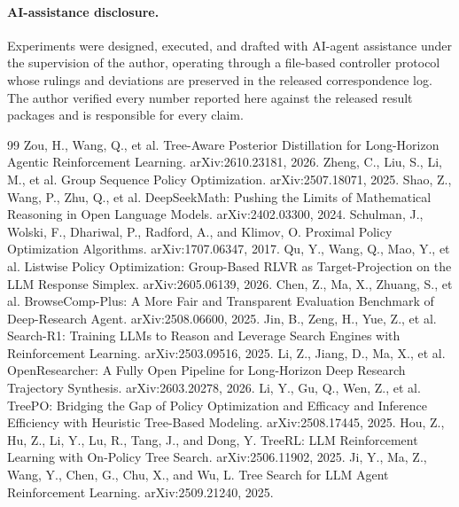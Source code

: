 \documentclass[11pt]{article}
\begin{document}
\paragraph{AI-assistance disclosure.} Experiments were designed, executed,
and drafted with AI-agent assistance under the supervision of the author,
operating through a file-based controller protocol whose rulings and
deviations are preserved in the released correspondence log. The author
verified every number reported here against the released result packages
and is responsible for every claim.

\begin{thebibliography}{99}
 Zou, H., Wang, Q., et al. Tree-Aware Posterior
Distillation for Long-Horizon Agentic Reinforcement Learning.
arXiv:2610.23181, 2026.
 Zheng, C., Liu, S., Li, M., et al. Group Sequence Policy
Optimization. arXiv:2507.18071, 2025.
 Shao, Z., Wang, P., Zhu, Q., et al. DeepSeekMath: Pushing
the Limits of Mathematical Reasoning in Open Language Models.
arXiv:2402.03300, 2024.
 Schulman, J., Wolski, F., Dhariwal, P., Radford, A., and
Klimov, O. Proximal Policy Optimization Algorithms. arXiv:1707.06347,
2017.
 Qu, Y., Wang, Q., Mao, Y., et al. Listwise Policy
Optimization: Group-Based RLVR as Target-Projection on the LLM Response
Simplex. arXiv:2605.06139, 2026.
 Chen, Z., Ma, X., Zhuang, S., et al. BrowseComp-Plus: A
More Fair and Transparent Evaluation Benchmark of Deep-Research Agent.
arXiv:2508.06600, 2025.
 Jin, B., Zeng, H., Yue, Z., et al. Search-R1: Training
LLMs to Reason and Leverage Search Engines with Reinforcement Learning.
arXiv:2503.09516, 2025.
 Li, Z., Jiang, D., Ma, X., et al.
OpenResearcher: A Fully Open Pipeline for Long-Horizon Deep Research
Trajectory Synthesis. arXiv:2603.20278, 2026.
 Li, Y., Gu, Q., Wen, Z., et al. TreePO: Bridging the
Gap of Policy Optimization and Efficacy and Inference Efficiency with
Heuristic Tree-Based Modeling. arXiv:2508.17445, 2025.
 Hou, Z., Hu, Z., Li, Y., Lu, R., Tang, J., and Dong, Y.
TreeRL: LLM Reinforcement Learning with On-Policy Tree Search.
arXiv:2506.11902, 2025.
 Ji, Y., Ma, Z., Wang, Y., Chen, G., Chu, X., and Wu, L.
Tree Search for LLM Agent Reinforcement Learning. arXiv:2509.21240,
2025.
\end{thebibliography}
\end{document}
